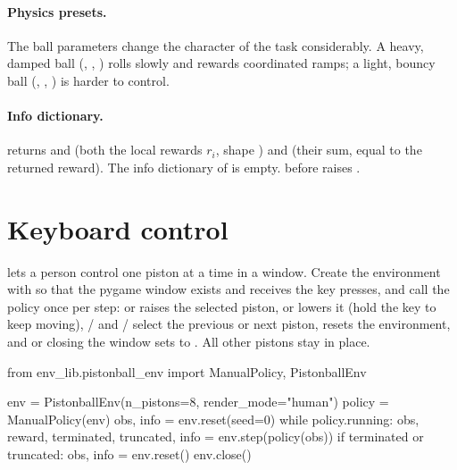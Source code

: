 \paragraph{Physics presets.} The ball parameters change the character of the
task considerably. A heavy, damped ball (,
, ) rolls slowly and rewards
coordinated ramps; a light, bouncy ball (,
, ) is harder to control.

\paragraph{Info dictionary.}  returns  and
 (both the  local rewards $r_i$, shape
) and  (their sum, equal to the returned
reward). The info dictionary of  is empty.  before
 raises .

\section{Keyboard control}\label{sec:pistonball-manual}

 lets a person control one
piston at a time in a window. Create the environment with
 so that the pygame window exists and receives the
key presses, and call the policy once per step:  or  raises
the selected piston,  or  lowers it (hold the key to keep
moving), / and / select the previous or
next piston,  resets the environment, and  or closing
the window sets  to . All other pistons stay
in place.

\begin{pycode}
from env_lib.pistonball_env import ManualPolicy, PistonballEnv

env = PistonballEnv(n_pistons=8, render_mode="human")
policy = ManualPolicy(env)
obs, info = env.reset(seed=0)
while policy.running:
    obs, reward, terminated, truncated, info = env.step(policy(obs))
    if terminated or truncated:
        obs, info = env.reset()
env.close()
\end{pycode}

